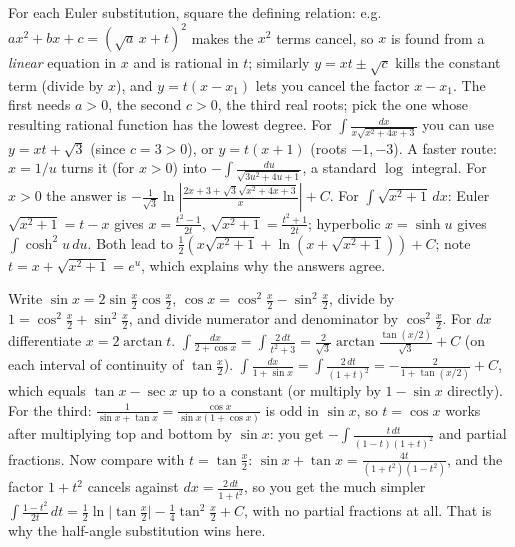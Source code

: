 \documentclass[11pt,a4paper]{article}
\begin{document}

For each Euler substitution, square the defining relation: e.g.~\(ax^2+bx+c=(\sqrt a\,x+t)^2\) makes the \(x^2\) terms cancel, so \(x\) is found from a \emph{linear} equation in \(x\) and is rational in \(t\); similarly \(y=xt\pm\sqrt c\) kills the constant term (divide by \(x\)), and \(y=t(x-x_1)\) lets you cancel the factor \(x-x_1\). The first needs \(a>0\), the second \(c>0\), the third real roots; pick the one whose resulting rational function has the lowest degree.
For \(\int\frac{dx}{x\sqrt{x^2+4x+3}}\) you can use \(y=xt+\sqrt3\) (since \(c=3>0\)), or \(y=t(x+1)\) (roots \(-1,-3\)). A faster route: \(x=1/u\) turns it (for \(x\gt 0\)) into \(-\int\frac{du}{\sqrt{3u^2+4u+1}}\), a standard \(\log\) integral. For \(x\gt 0\) the answer is \(-\frac1{\sqrt3}\ln\left\lvert\frac{2x+3+\sqrt3\sqrt{x^2+4x+3}}{x}\right\rvert+C\).
For \(\int\sqrt{x^2+1}\,dx\): Euler \(\sqrt{x^2+1}=t-x\) gives \(x=\frac{t^2-1}{2t}\), \(\sqrt{x^2+1}=\frac{t^2+1}{2t}\); hyperbolic \(x=\sinh u\) gives \(\int\cosh^2u\,du\). Both lead to \(\frac12\left(x\sqrt{x^2+1}+\ln(x+\sqrt{x^2+1})\right)+C\); note \(t=x+\sqrt{x^2+1}=e^u\), which explains why the answers agree.

Write \(\sin x=2\sin\frac x2\cos\frac x2\), \(\cos x=\cos^2\frac x2-\sin^2\frac x2\), divide by \(1=\cos^2\frac x2+\sin^2\frac x2\), and divide numerator and denominator by \(\cos^2\frac x2\). For \(dx\) differentiate \(x=2\arctan t\).
\(\int\frac{dx}{2+\cos x}=\int\frac{2\,dt}{t^2+3}=\frac{2}{\sqrt3}\arctan\frac{\tan(x/2)}{\sqrt3}+C\) (on each interval of continuity of \(\tan\frac x2\)). \(\int\frac{dx}{1+\sin x}=\int\frac{2\,dt}{(1+t)^2}=-\frac{2}{1+\tan(x/2)}+C\), which equals \(\tan x-\sec x\) up to a constant (or multiply by \(1-\sin x\) directly).
For the third: \(\frac1{\sin x+\tan x}=\frac{\cos x}{\sin x(1+\cos x)}\) is odd in \(\sin x\), so \(t=\cos x\) works after multiplying top and bottom by \(\sin x\): you get \(-\int\frac{t\,dt}{(1-t)(1+t)^2}\) and partial fractions. Now compare with \(t=\tan\frac x2\): \(\sin x+\tan x=\frac{4t}{(1+t^2)(1-t^2)}\), and the factor \(1+t^2\) cancels against \(dx=\frac{2\,dt}{1+t^2}\), so you get the much simpler \(\int\frac{1-t^2}{2t}\,dt=\frac12\ln\lvert\tan\frac x2\rvert-\frac14\tan^2\frac x2+C\), with no partial fractions at all. That is why the half-angle substitution wins here.
\end{document}
